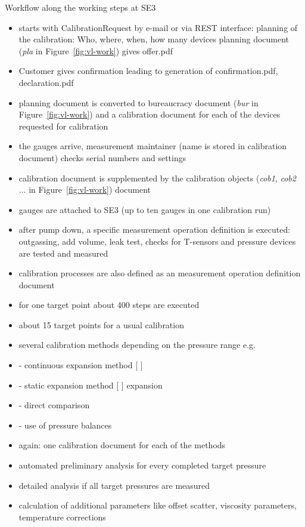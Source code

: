 \documentclass[3p,times,procedia]{elsarticle}
\begin{document}
Workflow along the working steps at SE3
\begin{itemize}
  
\item starts with CalibrationRequest by e-mail or via REST interface:
  planning of the calibration: Who, where, when, how many devices
  planning document (\emph{pla} in  Figure~\ref{fig:vl-work}) gives offer.pdf
\item Customer gives confirmation leading to generation of confirmation.pdf, declaration.pdf
\item planning document is converted to bureaucracy document (\emph{bur} in  Figure~\ref{fig:vl-work}) and a
  calibration document for each of the devices requested for
  calibration
\item the gauges arrive, measurement maintainer (name is stored in
  calibration document) checks serial numbers and settings
\item calibration document is supplemented by the calibration objects 
    (\emph{cob1}, \emph{cob2} ...  in  Figure~\ref{fig:vl-work}) document
\item gauges are attached to SE3 (up to ten gauges in one calibration
  run)
\item after pump down, a specific measurement operation definition is
  executed: outgassing, add volume, leak test, checks for T-sensors and
  pressure devices are tested and measured
\item calibration processes are also defined as an measurement
  operation definition document
\item for one target point about 400 steps are executed
\item about 15 target points for a usual calibration
\item several calibration methods depending on the pressure range e.g.
\item - continuous expansion method [\cite{} ]
\item - static expansion method [\cite{} ] expansion
\item - direct comparison
\item - use of pressure balances
\item again: one calibration document for each of the methods
\item automated preliminary analysis for every completed target
  pressure
\item detailed analysis if all target pressures are measured
\item calculation of additional parameters like offset scatter,
  viscosity parameters, temperature corrections
  

\end{itemize}
\end{document}
